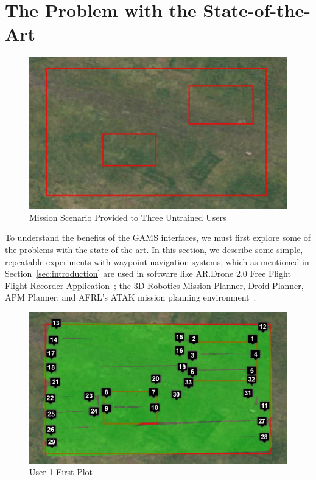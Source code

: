 \documentclass{sig-alternate-ipsn13}
\begin{document}
\section{The Problem with the State-of-the-Art}
\label{sec:waypoints}

\begin{figure}[htb]
  \centering
  \includegraphics[scale=0.4]{guiding_scenario}
  \caption{Mission Scenario Provided to Three Untrained Users}
  \label{fig:guiding}
\end{figure}

To understand the benefits of the GAMS interfaces, we must first explore some
of the problems with the state-of-the-art. In this section, we describe some
simple, repeatable experiments with waypoint navigation systems, which as
mentioned in Section~\ref{sec:introduction} are
used in software like AR.Drone 2.0 Free Flight
Flight Recorder Application~\cite{irizarry2012usability};
the 3D Robotics Mission Planner, Droid Planner,
APM Planner; and AFRL's ATAK mission planning environment~\cite{gillen2012beyond}.


\begin{figure}[h]
  \centering
  \includegraphics[scale=0.4]{user_waypoints_1}
  \caption{User 1 First Plot}
  \label{fig:user1_1}
\end{figure}
\end{document}
